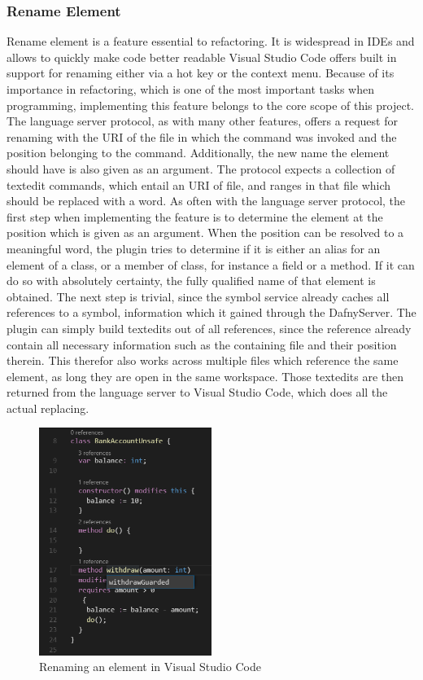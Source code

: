 \subsubsection{Rename Element} \label{renameelement}
Rename element is a feature essential to refactoring. It is widespread in IDEs and allows to quickly make code better readable Visual Studio Code offers built in support for renaming either via a hot key or the context menu. \newline
Because of its importance in refactoring, which is one of the most important tasks when programming, implementing this feature belongs to the core scope of this project. \newline
The language server protocol, as with many other features, offers a request for renaming with the URI of the file in which the command was invoked and the position belonging to the command. Additionally, the new name the element should have is also given as an argument. The protocol expects a collection of textedit commands, which entail an URI of file, and ranges in that file which should be replaced with a word. \newline
As often with the language server protocol, the first step when implementing the feature is to determine the element at the position which is given as an argument. When the position can be resolved to a meaningful word, the plugin tries to determine if it is either an alias for an element of a class, or a member of class, for instance a field or a method. If it can do so with absolutely certainty, the fully qualified name of that element is obtained. The next step is trivial, since the symbol service already caches all references to a symbol, information which it gained through the DafnyServer. The plugin can simply build textedits out of all references, since the reference already contain all necessary information such as the containing file and their position therein. This therefor also works across multiple files which reference the same element, as long they are open in the same workspace. Those textedits are then returned from the language server to Visual Studio Code, which does all the actual replacing. \newline
  \begin{figure}[H]
 	\centering
 	\includegraphics[width=0.5\textwidth]{img/rename}
 	\caption{Renaming an element in Visual Studio Code}
 	\label{fig:rename}
 \end{figure}
